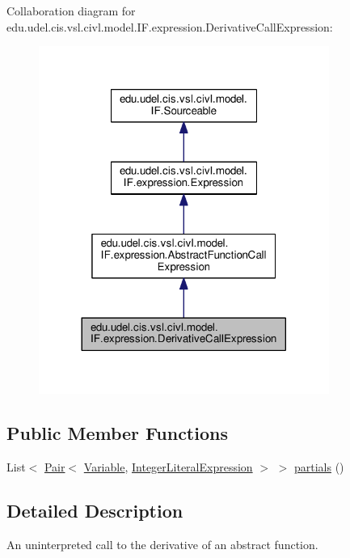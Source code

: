 Collaboration diagram for edu.\+udel.\+cis.\+vsl.\+civl.\+model.\+I\+F.\+expression.\+Derivative\+Call\+Expression\+:
\nopagebreak
\begin{figure}[H]
\begin{center}
\leavevmode
\includegraphics[width=269pt]{interfaceedu_1_1udel_1_1cis_1_1vsl_1_1civl_1_1model_1_1IF_1_1expression_1_1DerivativeCallExpression__coll__graph}
\end{center}
\end{figure}
\subsection*{Public Member Functions}
\begin{DoxyCompactItemize}
\item 
List$<$ \hyperlink{classedu_1_1udel_1_1cis_1_1vsl_1_1civl_1_1util_1_1IF_1_1Pair}{Pair}$<$ \hyperlink{interfaceedu_1_1udel_1_1cis_1_1vsl_1_1civl_1_1model_1_1IF_1_1variable_1_1Variable}{Variable}, \hyperlink{interfaceedu_1_1udel_1_1cis_1_1vsl_1_1civl_1_1model_1_1IF_1_1expression_1_1IntegerLiteralExpression}{Integer\+Literal\+Expression} $>$ $>$ \hyperlink{interfaceedu_1_1udel_1_1cis_1_1vsl_1_1civl_1_1model_1_1IF_1_1expression_1_1DerivativeCallExpression_a07960bc21130532e1bbb8f6be1fc815d}{partials} ()
\end{DoxyCompactItemize}


\subsection{Detailed Description}
An uninterpreted call to the derivative of an abstract function. 


